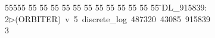 %
%
\begin{tabbing}
55555 \= 55 \= 55 \= 55 \= 55 \= 55 \= 55 \= 55 \= 55 \= 55 \= 55 \= 55 \= 55 \= \>DL\_915839:\\[0pt]
2\>$\triangleright$\>(ORBITER)\ v\ 5\ discrete\_log\ 487320\ 43085\ 915839\\[0pt]
3\>\end{tabbing}

